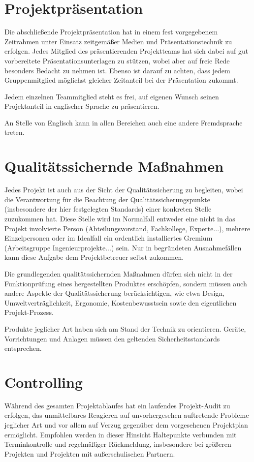 \section{Projektpräsentation}

Die abschließende Projektpräsentation hat in einem fest vorgegebenem Zeitrahmen unter Einsatz zeitgemäßer Medien und Präsentationstechnik zu erfolgen. Jedes Mitglied des präsentierenden Projektteams hat sich dabei auf gut vorbereitete  Präsentationsunterlagen zu stützen, wobei aber auf freie Rede besonders Bedacht zu nehmen ist. Ebenso ist darauf zu achten, dass jedem Gruppenmitglied möglichst gleicher Zeitanteil bei der Präsentation zukommt.

Jedem einzelnen Teammitglied steht es frei, auf eigenen Wunsch seinen Projektanteil in englischer Sprache zu präsentieren. 

An Stelle von Englisch kann in allen Bereichen auch eine andere Fremdsprache treten.

\section{Qualitätssichernde Maßnahmen}

Jedes Projekt ist auch aus der Sicht der Qualitätssicherung zu begleiten, wobei die Verantwortung für die Beachtung der Qualitätssicherungspunkte (insbesondere der hier festgelegten Standards) einer konkreten Stelle zuzukommen hat. Diese Stelle wird im Normalfall entweder eine nicht in das Projekt involvierte Person (Abteilungsvorstand, Fachkollege, Experte...), mehrere Einzelpersonen oder im Idealfall ein ordentlich installiertes Gremium (\glqq Arbeitsgruppe Ingenieurprojekte\grqq...) sein. Nur in begründeten Ausnahmefällen kann diese Aufgabe dem Projektbetreuer selbst zukommen.

Die grundlegenden qualitätssichernden Maßnahmen dürfen sich nicht in der Funktionprüfung eines hergestellten Produktes erschöpfen, sondern müssen auch andere Aspekte der Qualitätssicherung berücksichtigen, wie etwa Design, Umweltverträglichkeit,  Ergonomie, Kostenbewusstsein sowie den eigentlichen Projekt-Prozess. 

Produkte jeglicher Art haben sich am Stand der Technik zu orientieren. Geräte, Vorrichtungen und Anlagen müssen den geltenden Sicherheitsstandards entsprechen.

\section{Controlling}

Während des gesamten Projektablaufes hat ein laufendes Projekt-Audit zu erfolgen, das unmittelbares Reagieren auf unvorhergesehen auftretende Probleme jeglicher Art und vor allem auf Verzug gegenüber dem vorgesehenen Projektplan ermöglicht. Empfohlen werden in dieser Hinsicht Haltepunkte verbunden mit Terminkontrolle und regelmäßiger Rückmeldung, insbesondere bei größeren Projekten und Projekten mit außerschulischen Partnern. 